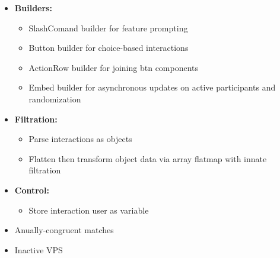 \documentclass[7px]{article}
\begin{document}
{
  \begin{itemize}[label=\textsection]
    \item {\textbf{Builders:}}
      \small
      \begin{itemize}[label=$\multimapdotinv$, leftmargin=3mm]
        \item SlashComand builder for feature prompting
        \item Button builder for choice-based interactions
        \item ActionRow builder for joining btn components
        \item Embed builder for asynchronous updates on active participants and randomization
      \end{itemize}
      \normalsize
    \item \textbf{Filtration:}
      \small 
      \begin{itemize}[label=$\multimapdotinv$, leftmargin=3mm]
        \item Parse interactions as objects
        \item Flatten then transform object data via array flatmap with innate filtration
      \end{itemize}
      \normalsize
    \item \textbf{Control: }
      \small
      \begin{itemize}[label=$\multimapdotinv$, leftmargin=3mm]
        \item Store interaction user as variable
      \end{itemize}
      \normalsize
  \end{itemize}
}
{
  \raggedright
  \begin{itemize}[label=\blitzb]
    \small
    \item Anually-congruent matches
    \item Inactive VPS
  \end{itemize}
}
\end{document}
